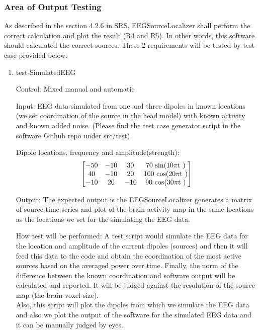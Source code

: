 \documentclass[12pt, titlepage]{article}
\renewcommand{\progname}{EEGSourceLocalizer}
\begin{document}
\subsubsection{Area of Output Testing}

As described in the section 4.2.6 in SRS, \progname{}  shall perform the correct calculation and plot the result (R4 and R5). In other words, this software should calculated the correct sources. These 2 requirements will be tested by test case provided below.\\

\begin{enumerate}
\item{test-SimulatedEEG\\}

Control: Mixed manual and automatic
					
Input: EEG data simulated from one and three dipoles in known locations (we set coordination of the source in the head model) with known activity and known added noise. (Please find the test case generator script in the software Github repo under src/test)

Dipole locations, frequency and amplitude(strength):
\[
\begin{bmatrix}
 -50& -10& 30 & $70 sin(10$\pi$t )$\\
 40 &-10& 20 &  $100 cos(20$\pi$t )$ \\
 -10& 20 &-10&  $90 cos(30$\pi$t )$
\end{bmatrix} 
\]

	
Output: The expected output is the \progname{} generates a matrix of source time series and plot of the brain activity map in the same locations as the locations we set for the simulating the EEG data.

How test will be performed: A test script would simulate the EEG data for the location and amplitude of the current dipoles (sources) and then it will feed this data to the code and obtain the coordination of the most active sources based on the averaged power over time. Finally, the norm of the difference between the known coordination and software output will be calculated and reported. It will be judged against the resolution of the source map (the brain voxel size).\\
 Also, this script will plot the dipoles from which we simulate the EEG data and also we plot the output of the software for the simulated EEG data and it can be manually judged by eyes. 





\end{enumerate}
\end{document}
